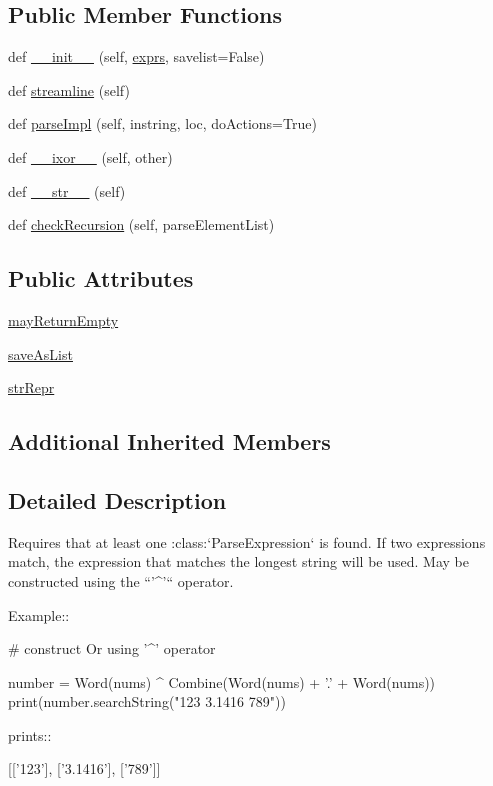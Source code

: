 \subsection*{Public Member Functions}
\begin{DoxyCompactItemize}
\item 
def \hyperlink{classpyparsing_1_1Or_a6cd23cffb3f65b69c5b3ce51e7f1919f}{\+\_\+\+\_\+init\+\_\+\+\_\+} (self, \hyperlink{classpyparsing_1_1ParseExpression_a18a085fff96b65ee97761c3bf27d3675}{exprs}, savelist=False)
\item 
def \hyperlink{classpyparsing_1_1Or_a933e95b02f43d742d475edc1e0e25cfd}{streamline} (self)
\item 
def \hyperlink{classpyparsing_1_1Or_a7085f759a9ab87fbc509053abd465ed2}{parse\+Impl} (self, instring, loc, do\+Actions=True)
\item 
def \hyperlink{classpyparsing_1_1Or_a9c84836a3a0b451893d4ffa5989caeaa}{\+\_\+\+\_\+ixor\+\_\+\+\_\+} (self, other)
\item 
def \hyperlink{classpyparsing_1_1Or_a8717ef90cb745d353c1b745d3706e0fd}{\+\_\+\+\_\+str\+\_\+\+\_\+} (self)
\item 
def \hyperlink{classpyparsing_1_1Or_ac9088225b281200d39d49118b0a0ab54}{check\+Recursion} (self, parse\+Element\+List)
\end{DoxyCompactItemize}
\subsection*{Public Attributes}
\begin{DoxyCompactItemize}
\item 
\hyperlink{classpyparsing_1_1Or_a4f703a6a209f8308c55ca5070309bf40}{may\+Return\+Empty}
\item 
\hyperlink{classpyparsing_1_1Or_adbf4f1a3c56f5d74365edbbe89ce40d3}{save\+As\+List}
\item 
\hyperlink{classpyparsing_1_1Or_af37830587dcd6e29c614ec72f5500177}{str\+Repr}
\end{DoxyCompactItemize}
\subsection*{Additional Inherited Members}


\subsection{Detailed Description}
\begin{DoxyVerb}Requires that at least one :class:`ParseExpression` is found. If
two expressions match, the expression that matches the longest
string will be used. May be constructed using the ``'^'``
operator.

Example::

    # construct Or using '^' operator

    number = Word(nums) ^ Combine(Word(nums) + '.' + Word(nums))
    print(number.searchString("123 3.1416 789"))

prints::

    [['123'], ['3.1416'], ['789']]
\end{DoxyVerb}
 

